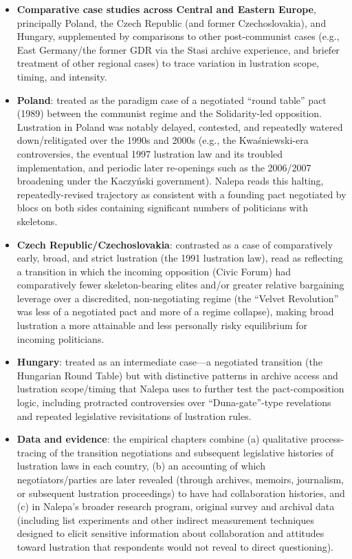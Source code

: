\documentclass[12pt]{article}
\begin{document}
\begin{itemize}[leftmargin=*, itemsep=4pt]
    \item \textbf{Comparative case studies across Central and Eastern Europe}, principally Poland, the Czech Republic (and former Czechoslovakia), and Hungary, supplemented by comparisons to other post-communist cases (e.g., East Germany/the former GDR via the Stasi archive experience, and briefer treatment of other regional cases) to trace variation in lustration scope, timing, and intensity.
    \item \textbf{Poland}: treated as the paradigm case of a negotiated ``round table'' pact (1989) between the communist regime and the Solidarity-led opposition. Lustration in Poland was notably delayed, contested, and repeatedly watered down/relitigated over the 1990s and 2000s (e.g., the Kwa\'sniewski-era controversies, the eventual 1997 lustration law and its troubled implementation, and periodic later re-openings such as the 2006/2007 broadening under the Kaczy\'nski government). Nalepa reads this halting, repeatedly-revised trajectory as consistent with a founding pact negotiated by blocs on both sides containing significant numbers of politicians with skeletons.
    \item \textbf{Czech Republic/Czechoslovakia}: contrasted as a case of comparatively early, broad, and strict lustration (the 1991 lustration law), read as reflecting a transition in which the incoming opposition (Civic Forum) had comparatively fewer skeleton-bearing elites and/or greater relative bargaining leverage over a discredited, non-negotiating regime (the ``Velvet Revolution'' was less of a negotiated pact and more of a regime collapse), making broad lustration a more attainable and less personally risky equilibrium for incoming politicians.
    \item \textbf{Hungary}: treated as an intermediate case---a negotiated transition (the Hungarian Round Table) but with distinctive patterns in archive access and lustration scope/timing that Nalepa uses to further test the pact-composition logic, including protracted controversies over ``Duna-gate''-type revelations and repeated legislative revisitations of lustration rules.
    \item \textbf{Data and evidence}: the empirical chapters combine (a) qualitative process-tracing of the transition negotiations and subsequent legislative histories of lustration laws in each country, (b) an accounting of which negotiators/parties are later revealed (through archives, memoirs, journalism, or subsequent lustration proceedings) to have had collaboration histories, and (c) in Nalepa's broader research program, original survey and archival data (including list experiments and other indirect measurement techniques designed to elicit sensitive information about collaboration and attitudes toward lustration that respondents would not reveal to direct questioning).

\end{itemize}
\end{document}
